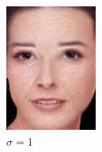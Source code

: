 \begin{figure}[t]
\centering
	\begin{subfigure}[t]{0.2\textwidth}
		\includegraphics[width=\textwidth]{gandhi/sim1.png}
		\caption{$\sigma = 1$ }
	\end{subfigure}
	\begin{subfigure}[t]{0.2\textwidth}

\end{subfigure}
\end{figure}
